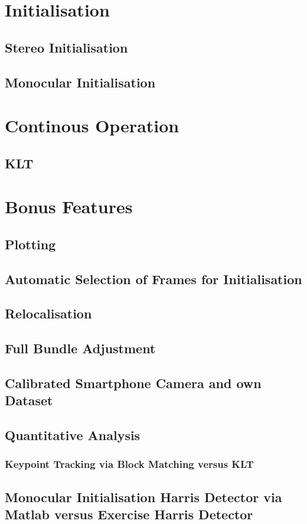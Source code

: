 \section{Initialisation}
\label{s:Initialisation}

\subsection{Stereo Initialisation}

\subsection{Monocular Initialisation}


\section{Continous Operation}
\label{s:ContOp}

\subsection{KLT}

\section{Bonus Features}
\label{s:BF}

\subsection{Plotting}

\subsection{Automatic Selection of Frames for Initialisation}

\subsection{Relocalisation}

\subsection{Full Bundle Adjustment}

\subsection{Calibrated Smartphone Camera and own Dataset}

\subsection{Quantitative Analysis}
\subsubsection{Keypoint Tracking via Block Matching versus KLT}
\subsection{Monocular Initialisation Harris Detector via Matlab versus Exercise Harris Detector}